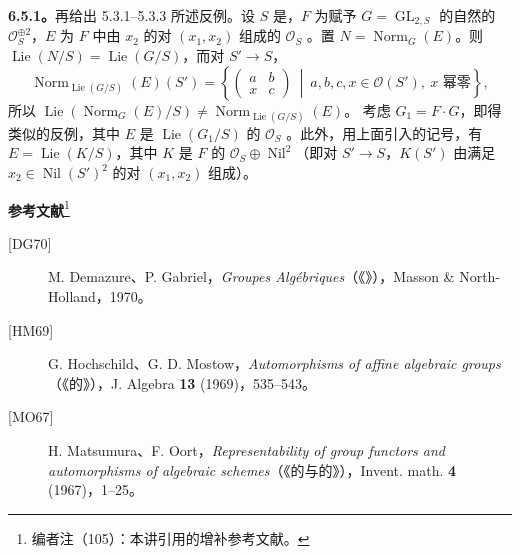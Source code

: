 \textbf{6.5.1。}再给出 5.3.1--5.3.3 所述反例。设 $S$ 是，$F$ 为赋予 $G=\operatorname{GL}_{2,S}$ 的自然的 $\mathcal O_S^{\oplus2}$，$E$ 为 $F$ 中由 $x_2$ 的对 $(x_1,x_2)$ 组成的 $\mathcal O_S$ 。置 $N=\operatorname{Norm}_G(E)$。则 $\operatorname{Lie}(N/S)=\operatorname{Lie}(G/S)$，而对 $S'\to S$，
\[\operatorname{Norm}_{\operatorname{Lie}(G/S)}(E)(S')=\left\{\begin{pmatrix}a&b\\x&c\end{pmatrix}\ \middle|\ a,b,c,x\in\mathcal O(S'),\ x\text{ 幂零}\right\},\]
所以 $\operatorname{Lie}(\operatorname{Norm}_G(E)/S)\ne\operatorname{Norm}_{\operatorname{Lie}(G/S)}(E)$。
考虑 $G_1=F\cdot G$，即得类似的反例，其中 $E$ 是 $\operatorname{Lie}(G_1/S)$ 的 $\mathcal O_S$ 。此外，用上面引入的记号，有 $E=\operatorname{Lie}(K/S)$，其中 $K$ 是 $F$ 的 $\mathcal O_S\oplus\operatorname{Nil}^2$（即对 $S'\to S$，$K(S')$ 由满足 $x_2\in\operatorname{Nil}(S')^2$ 的对 $(x_1,x_2)$ 组成）。

\textbf{参考文献}\footnote{编者注（105）：本讲引用的增补参考文献。}
\begin{description}
\item[{[DG70]}] M. Demazure、P. Gabriel，\emph{Groupes Algébriques}（《》），Masson \& North-Holland，1970。
\item[{[HM69]}] G. Hochschild、G. D. Mostow，\emph{Automorphisms of affine algebraic groups}（《的》），J. Algebra \textbf{13} (1969)，535--543。
\item[{[MO67]}] H. Matsumura、F. Oort，\emph{Representability of group functors and automorphisms of algebraic schemes}（《的与的》），Invent. math. \textbf{4} (1967)，1--25。
\end{description}

